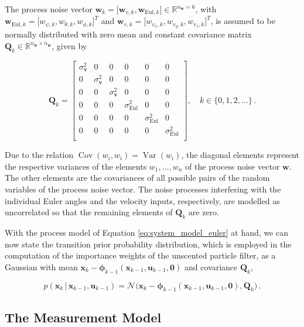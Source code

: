 \noindent
The process noise vector $\bm{w}_k = \big[\bm{w}_{v,k}, \bm{w}_{{\mathrm{Eul}},k}\big] \in \mathbb{R}^{n_{\bm{w}}=6}$, with $\bm{w}_{{\mathrm{Eul}},k} = \big[w_{\psi, {k}}, w_{\theta, {k}}, w_{\phi, {k}}\big]^T$ and $\bm{w}_{v,k} = \big[w_{v_x, {k}}, w_{v_y, {k}}, w_{v_z, {k}}\big]^T$, is assumed to be normally distributed with zero mean and constant covariance matrix $\bm{Q}_k \in \mathbb{R}^{n_{\bm{w}} \times n_{\bm{w}}}$, given by

\begin{equation}
\bm{Q}_k = \begin{bmatrix}
  \sigma^2_{\bm{v}} & 0 & 0 & 0 & 0 & 0 \\
  0 & \sigma^2_{\bm{v}} & 0 & 0 & 0 & 0 \\
  0 & 0 & \sigma^2_{\bm{v}} & 0 & 0 & 0 \\
  0 & 0 & 0 & \sigma^2_{\mathrm{Eul}} & 0 & 0 \\
  0 & 0 & 0 & 0 & \sigma^2_{\mathrm{Eul}} & 0 \\
  0 & 0 & 0 & 0 & 0 & \sigma^2_{\mathrm{Eul}} \\
\end{bmatrix}, \quad k \in \{0, 1, 2, \dots\}\,.
\end{equation}

\noindent
Due to the relation $\operatorname{Cov}(w_i,w_i) = \operatorname{Var}(w_i)$, the diagonal elements represent the respective variances of the elements $w_1, \dots, w_n$ of the process noise vector $\bm{w}$. The other elements are the covariances of all possible pairs of the random variables of the process noise vector. The noise processes interfering with the individual Euler angles and the velocity inputs, respectively, are modelled as uncorrelated so that the remaining elements of $\bm{Q}_k$ are zero.

With the process model of Equation \ref{eq:system_model_euler} at hand, we can now state the transition prior probability distribution, which is employed in the computation of the importance weights of the unscented particle filter, as a Gaussian with mean $\bm{x}_k - \bm{\phi}_{k-1}(\bm{x}_{k-1}, \bm{u}_{k-1}, \bm{0})$ and covariance $\bm{Q}_k$,

\begin{equation}
p(\bm{x}_k\,|\,\bm{x}_{k-1}, \bm{u}_{k-1}) = \mathcal{N}\big(\bm{x}_k - \bm{\phi}_{k-1}(\bm{x}_{k-1}, \bm{u}_{k-1}, \bm{0}), \bm{Q}_k \big)\,.
\end{equation}

\subsection{The Measurement Model}\label{sec:measurement_model_prob}

